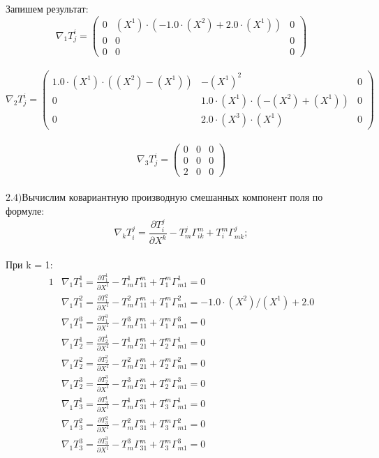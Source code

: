 \documentclass[a4paper, 12pt, oneside]{article}
\begin{document}
Запишем результат:\\
\[
\nabla_1T^i_j = \begin{pmatrix}
	0 & (X^1)\cdot (-1.0\cdot (X^2) + 2.0\cdot (X^1)) & 0\\
	0 & 0 & 0\\
	0 & 0 & 0
\end{pmatrix}
\]\\
\[
\nabla_2T^i_j = \begin{pmatrix}
	1.0\cdot (X^1)\cdot ((X^2) - (X^1)) & -(X^1)^2 & 0\\
	0 & 1.0\cdot (X^1)\cdot (-(X^2) + (X^1)) & 0\\
	0 & 2.0\cdot (X^3)\cdot (X^1) & 0
\end{pmatrix}
\]\\
\[
\nabla_3T^i_j = \begin{pmatrix}
	0 & 0 & 0\\
	0 & 0 & 0\\
	2 & 0 & 0
\end{pmatrix}
\]\\
$\mathrm{2.4) }$Вычислим ковариантную производную смешанных компонент поля по формуле:\\
\[
\nabla_kT^j_i = \frac{\partial T^j_i}{\partial X^k} - T^j_m\Gamma^m_{ik} + T^m_i\Gamma^j_{mk};
\]\\
При k = 1:\\
\begin{alignat*}{1}
  & \nabla_1T^1_1 = \frac{\partial T^1_1}{\partial X^1} - T^1_m\Gamma^m_{11} + T^m_1\Gamma^1_{m1} = 0 \\
  & \nabla_1T^2_1 = \frac{\partial T^2_1}{\partial X^1} - T^2_m\Gamma^m_{11} + T^m_1\Gamma^2_{m1} = -1.0\cdot (X^2)/(X^1) + 2.0 \\
  & \nabla_1T^3_1 = \frac{\partial T^3_1}{\partial X^1} - T^3_m\Gamma^m_{11} + T^m_1\Gamma^3_{m1} = 0 \\
  & \nabla_1T^1_2 = \frac{\partial T^1_2}{\partial X^1} - T^1_m\Gamma^m_{21} + T^m_2\Gamma^1_{m1} = 0 \\
  & \nabla_1T^2_2 = \frac{\partial T^2_2}{\partial X^1} - T^2_m\Gamma^m_{21} + T^m_2\Gamma^2_{m1} = 0 \\
  & \nabla_1T^3_2 = \frac{\partial T^3_2}{\partial X^1} - T^3_m\Gamma^m_{21} + T^m_2\Gamma^3_{m1} = 0 \\
  & \nabla_1T^1_3 = \frac{\partial T^1_3}{\partial X^1} - T^1_m\Gamma^m_{31} + T^m_3\Gamma^1_{m1} = 0 \\
  & \nabla_1T^2_3 = \frac{\partial T^2_3}{\partial X^1} - T^2_m\Gamma^m_{31} + T^m_3\Gamma^2_{m1} = 0 \\
  & \nabla_1T^3_3 = \frac{\partial T^3_3}{\partial X^1} - T^3_m\Gamma^m_{31} + T^m_3\Gamma^3_{m1} = 0 
\end{alignat*}\\
\end{document}
